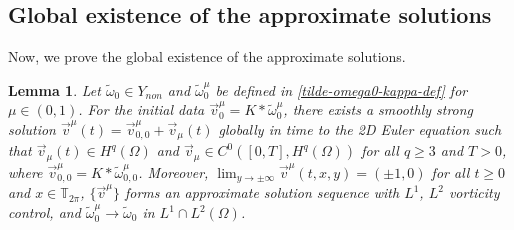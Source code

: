 \documentclass[1 [leqno, 11pt]{amsart}
\numberwithin{equation}{section}
\newtheorem{lemma}[Theorem]{Lemma}
\begin{document}
\begin{CJK*}{GBK}{song}
\begin{appendix}
\subsection{Global existence  of the approximate solutions}
Now, we prove the global existence  of the approximate solutions.
\begin{lemma}\label{lem-construction of an approximate solution sequence}
Let $\tilde\omega_0\in  Y_{non}$ and $\tilde\omega_0^{\mu}$ be defined in  \eqref{tilde-omega0-kappa-def} for $\mu\in(0,1)$.
For the initial data $\vec{v}_0^{\mu}=K\ast\tilde\omega_0^{\mu}$, there exists  a smoothly strong solution $\vec{v}^{\mu}(t)=\vec{v}_{0,0}^{\mu}+\vec{v}_{\mu}(t)$  globally in time   to the 2D Euler equation such that
 $\vec{v}_{\mu}(t)\in H^q(\Omega)$ and $\vec{v}_{\mu}\in C^0([0,T], H^q(\Omega))$   for all $q\geq3$ and $T>0$, where $\vec{v}_{0,0}^{\mu}=K\ast\tilde\omega_{0,0}^{\mu}$. Moreover, $\lim_{y\to\pm\infty}\vec{v}^{\mu}(t,x,y)=(\pm1,0)$ for all $t\geq0$ and $x\in\mathbb{T}_{2\pi}$,
$\{\vec{v}^{\mu}\}$ forms an approximate solution sequence with $L^1$, $L^2$ vorticity control,
and $\tilde \omega_0^{\mu}\to\tilde\omega_0$ in $L^1\cap L^2(\Omega)$.
\end{lemma}


\end{appendix}
\end{CJK*}
\end{document}
